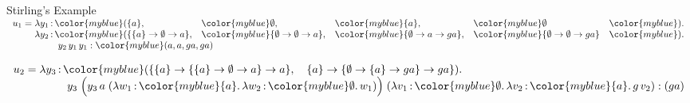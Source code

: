 \documentclass{beamer}
\renewcommand{\:}{\mbox{\,:\,}\xspace}
\newcommand{\type}[1]{{\color{myblue}#1}}
\begin{document}
  \begin{frame}{Stirling's Example}
    \small
    $
  \begin{array}{l@{\;}c@{\;}lllll}
    u_1 & = &  \lambda y_1\:\type{(\{a\},} & \type{\emptyset,} & \type{\{a\}}, & \type{\emptyset} &\type{)}.\, \\ & &
                                                                                           \lambda y_2\:\type{(\{\{a\} \to \emptyset \to a\},} & 
                        \type{\{\emptyset \to \emptyset \to a\},} &
                        \type{\{\emptyset \to a \to ga\},} &
                         \type{\{\emptyset \to \emptyset \to ga\}} &\type{)}.\,\\ & &
                   \multicolumn{2}{l}{\qquad y_2\, y_1\, y_1 : {\type{(a,  a,  ga,  ga )}}}
  \end{array}
$

\medskip

$
  \begin{array}{l@{\;}c@{\;}lllll}
    u_2 & = & \lambda y_3\:\type{(\{ \{a\} \to \{\{a\} \to \emptyset \to a\} \to a\},\quad
                               \{a\} \to \{\emptyset \to \{a\} \to ga\} \to ga \})}.\,\\ & &
               \multicolumn{2}{l}{\qquad y_3\;\Bigl(y_3\, a\; (\lambda w_1\:\type{\{a\}}.\, \lambda w_2\:\type{\emptyset}.\, w_1)\Bigr)
               \;(\lambda v_1\:\type{\emptyset}.\, \lambda v_2\:\type{\{a\}}.\, g\, v_2) : (ga)}\\
  \end{array}
$

\medskip


\end{frame}
\end{document}
